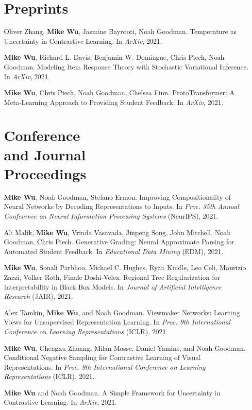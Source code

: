 \documentclass[margin, 10pt]{res} %
\begin{document}
\begin{resume}
\section{Preprints}

Oliver Zhang, \textbf{Mike Wu}, Jasmine Bayrooti, Noah Goodman. Temperature as Uncertainty in Contrastive Learning. In \textit{ArXiv}, 2021.

\textbf{Mike Wu}, Richard L. Davis, Benjamin W. Domingue, Chris Piech, Noah Goodman. Modeling Item Response Theory with Stochastic Variational Inference. In \textit{ArXiv}, 2021.

\textbf{Mike Wu}, Chris Piech, Noah Goodman, Chelsea Finn. ProtoTransformer: A Meta-Learning Approach to Providing Student Feedback. In \textit{ArXiv}, 2021.

\section{Conference \\and Journal \\Proceedings}

\textbf{Mike Wu}, Noah Goodman, Stefano Ermon. Improving Compositionality of Neural Networks by Decoding Representations to Inputs. In \textit{Proc. 35th Annual Conference on Neural Information Processing Systems} (NeurIPS), 2021.

Ali Malik, \textbf{Mike Wu}, Vrinda Vasavada, Jinpeng Song, John Mitchell, Noah Goodman, Chris Piech. Generative Grading: Neural Approximate Parsing for Automated Student Feedback. In \textit{Educational Data Mining} (EDM), 2021. 

\textbf{Mike Wu}, Sonali Parbhoo, Michael C. Hughes, Ryan Kindle, Leo Celi, Maurizio Zazzi, Volker Roth, Finale Doshi-Velez. Regional Tree Regularization for Interpretability in Black Box Models. In \textit{Journal of Artificial Intelligence Research} (JAIR), 2021.

Alex Tamkin, \textbf{Mike Wu}, and Noah Goodman. Viewmaker Networks: Learning Views for Unsupervised Representation Learning. In \textit{Proc. 9th International Conference on Learning Representations} (ICLR), 2021.

\textbf{Mike Wu}, Chengxu Zhuang, Milan Mosse, Daniel Yamins, and Noah Goodman. Conditional Negative Sampling for Contrastive Learning of Visual Representations. In \textit{Proc. 9th International Conference on Learning Representations} (ICLR), 2021.

\textbf{Mike Wu} and Noah Goodman. A Simple Framework for Uncertainty in Contrastive Learning. In \textit{ArXiv}, 2021. 


\end{resume}
\end{document}
